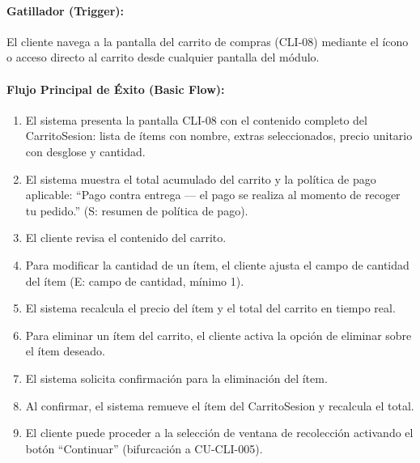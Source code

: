 \paragraph{Gatillador (Trigger):} El cliente navega a la pantalla del carrito de compras (CLI-08) mediante el ícono o acceso directo al carrito desde cualquier pantalla del módulo.

\paragraph{Flujo Principal de Éxito (Basic Flow):}
\begin{enumerate}
    \item[I.] El sistema presenta la pantalla CLI-08 con el contenido completo del CarritoSesion: lista de ítems con nombre, extras seleccionados, precio unitario con desglose y cantidad.
    \item[II.] El sistema muestra el total acumulado del carrito y la política de pago aplicable: ``Pago contra entrega --- el pago se realiza al momento de recoger tu pedido.'' (S: resumen de política de pago).
    \item[III.] El cliente revisa el contenido del carrito.
    \item[IV.] Para modificar la cantidad de un ítem, el cliente ajusta el campo de cantidad del ítem (E: campo de cantidad, mínimo 1).
    \item[V.] El sistema recalcula el precio del ítem y el total del carrito en tiempo real.
    \item[VI.] Para eliminar un ítem del carrito, el cliente activa la opción de eliminar sobre el ítem deseado.
    \item[VII.] El sistema solicita confirmación para la eliminación del ítem.
    \item[VIII.] Al confirmar, el sistema remueve el ítem del CarritoSesion y recalcula el total.
    \item[IX.] El cliente puede proceder a la selección de ventana de recolección activando el botón ``Continuar'' (bifurcación a CU-CLI-005).
\end{enumerate}


